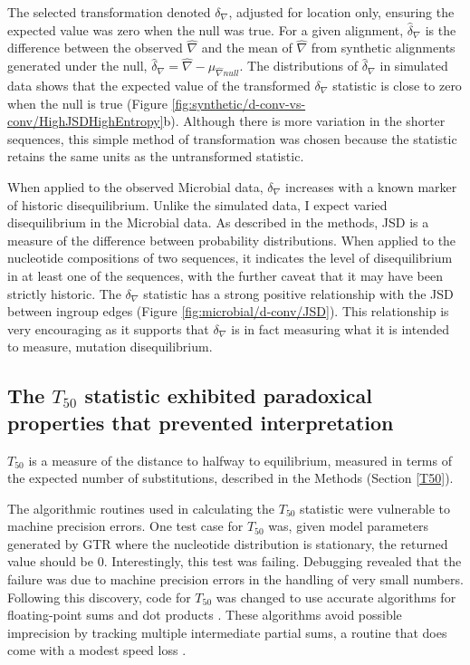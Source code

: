 

The selected transformation denoted $\delta_\nabla$, adjusted for location only, ensuring the expected value was zero when the null was true. For a given alignment, $\hat \delta_\nabla$ is the difference between the observed $\hat \nabla$ and the mean of $\hat \nabla$ from synthetic alignments generated under the null, $\hat \delta_\nabla =  \hat\nabla - \mu_{\hat \nabla{null}}.$ The distributions of $\hat \delta_\nabla$ in simulated data shows that the expected value of the transformed $\delta_\nabla$ statistic is close to zero when the null is true (Figure \ref{fig:synthetic/d-conv-vs-conv/HighJSDHighEntropy}b). Although there is more variation in the shorter sequences, this simple method of transformation was chosen because the statistic retains the same units as the untransformed statistic. 

When applied to the observed Microbial data, $\delta_\nabla$ increases with a known marker of historic disequilibrium. Unlike the simulated data, I expect varied disequilibrium in the Microbial data. As described in the methods, \acrshort{JSD} is a measure of the difference between probability distributions. When applied to the nucleotide compositions of two sequences, it indicates the level of disequilibrium in at least one of the sequences, with the further caveat that it may have been strictly historic. The $\delta_\nabla$ statistic has a strong positive relationship with the JSD between ingroup edges (Figure \ref{fig:microbial/d-conv/JSD}). This relationship is very encouraging as it supports that $\delta_\nabla$ is in fact measuring what it is intended to measure, mutation disequilibrium. 



\subsection{The $T_{50}$ statistic exhibited paradoxical properties that prevented interpretation}
\label{T50_results}

$T_{50}$ is a measure of the distance to halfway to equilibrium, measured in terms of the expected number of substitutions, described in the Methods (Section \ref{T50}). 

The algorithmic routines used in calculating the $T_{50}$ statistic were vulnerable to machine precision errors. One test case for $T_{50}$ was, given model parameters generated by GTR where the nucleotide distribution is stationary, the returned value should be $0$. Interestingly, this test was failing. Debugging revealed that the failure was due to machine precision errors in the handling of very small numbers. Following this discovery, code for $T_{50}$ was changed to use accurate algorithms for floating-point sums and dot products \citep{accupy}. These algorithms avoid possible imprecision by tracking multiple intermediate partial sums, a routine that does come with a modest speed loss \citep{Shewchuk1997AdaptivePredicates, Ogita2005AccurateProduct}. 

